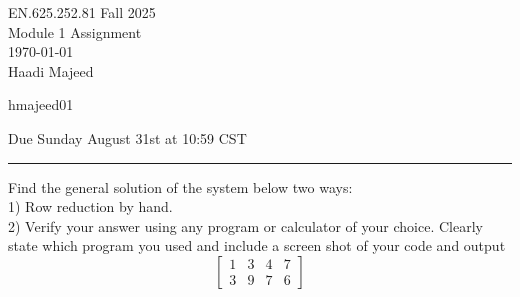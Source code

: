 \documentclass[12pt,letterpaper, onecolumn]{exam}
\begin{document}
\begingroup  
    \centering
    \LARGE EN.625.252.81 Fall 2025\\
    \LARGE Module 1 Assignment\\[0.5em]
    \large \today\\[0.5em]
    \large Haadi Majeed\par
    \large hmajeed01\par
    \large Due Sunday August 31st at 10:59 CST\par
\endgroup
\rule{\textwidth}{0.4pt}
\printanswers
\renewcommand{\solutiontitle}{\noindent\textbf{Ans:}\enspace}

\begin{questions}

    \question Find the general solution of the system below two ways:\\
        1) Row reduction by hand.\\
        2) Verify your answer using any program or calculator of your choice. Clearly state which program you used and include a screen shot of your code and output\\
        $$
        \begin{bmatrix}
            1 & 3 & 4 & 7\\
            3 & 9 & 7 & 6
        \end{bmatrix}
        $$
        \begin{solution}
            \begin{center}
                

\end{center}
\end{solution}
\end{questions}
\end{document}
